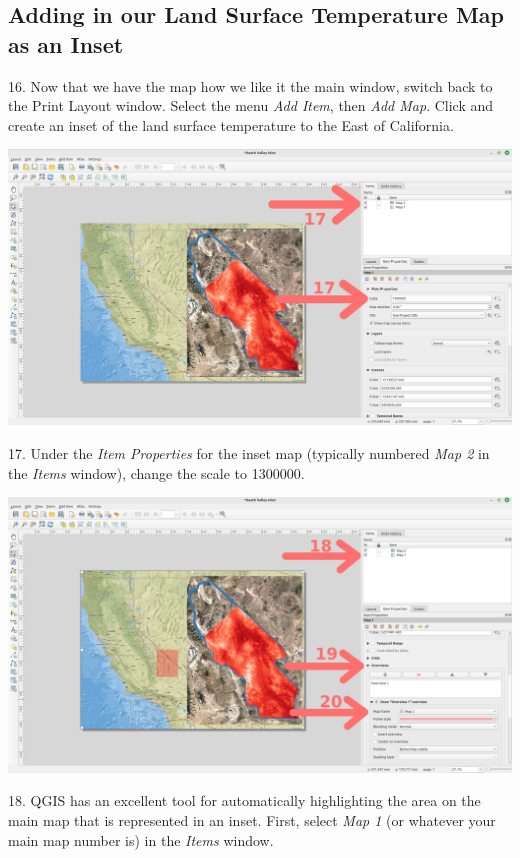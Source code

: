\documentclass[oneside,a4paper,11pt,explicit]{book}
\begin{document}
\subsection{Adding in our Land Surface Temperature Map as an Inset}

16. Now that we have the map how we like it the main window, switch back to the Print Layout window. Select the menu \textit{Add Item}, then \textit{Add Map}. Click and create an inset of the land surface temperature to the East of California.

\vspace{.25em}

\centerline{\includegraphics[width=\textwidth]{AddInset.png}}

17. Under the \textit{Item Properties} for the inset map (typically numbered \textit{Map 2} in the \textit{Items} window), change the scale to 1300000.

\vspace{.25em}

\centerline{\includegraphics[width=\textwidth]{RegionShade.png}}

18. QGIS has an excellent tool for automatically highlighting the area on the main map that is represented in an inset. First, select \textit{Map 1} (or whatever your main map number is) in the \textit{Items} window.
 
\end{document}

